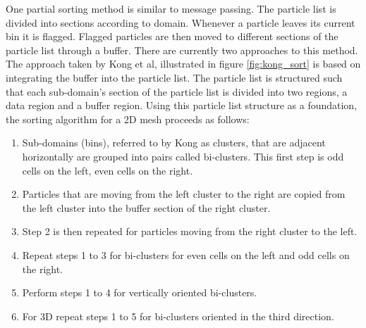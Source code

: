 	One partial sorting method is similar to message passing. The particle list is divided into sections according to domain. Whenever a particle leaves its current bin it is flagged. Flagged particles are then moved to different sections of the particle list through a buffer. There are currently two approaches to this method. The approach taken by Kong et al, illustrated in figure \ref{fig:kong_sort} is based on integrating the buffer into the particle list. The particle list is structured such that each sub-domain's section of the particle list is divided into two regions, a data region and a buffer region. Using this particle list structure as a foundation, the sorting algorithm for a 2D mesh proceeds as follows\cite{Kong2011}:

\begin{enumerate}
\singlespace
\item Sub-domains (bins), referred to by Kong as clusters, that are adjacent horizontally are grouped into pairs called bi-clusters. This first step is odd cells on the left, even cells on the right. 
\item Particles that are moving from the left cluster to the right are copied from the left cluster into the buffer section of the right cluster. 
\item Step 2 is then repeated for particles moving from the right cluster to the left. 
\item Repeat steps 1 to 3 for bi-clusters for even cells on the left and odd cells on the right. 
\item Perform steps 1 to 4 for vertically oriented bi-clusters.  
\item For 3D repeat steps 1 to 5 for bi-clusters oriented in the third direction.
\end{enumerate}


